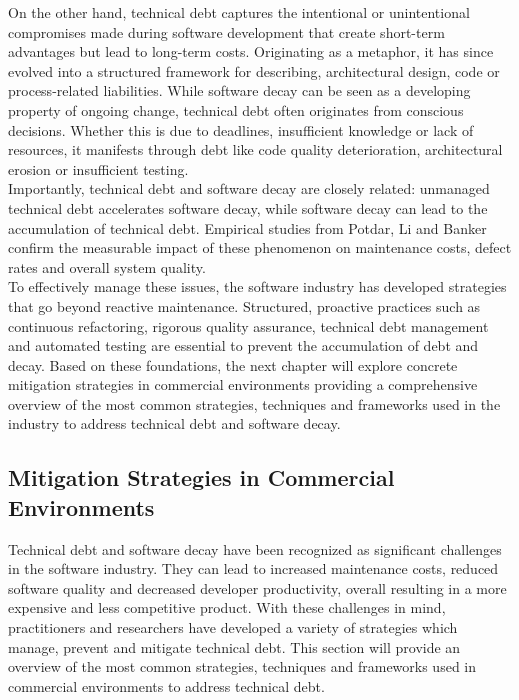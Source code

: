 On the other hand, technical debt captures the intentional or unintentional compromises made during software development that create short-term advantages but lead to long-term costs. Originating as a metaphor, it has since evolved into a structured framework for describing, architectural design, code or process-related liabilities.
While software decay can be seen as a developing property of ongoing change, technical debt often originates from conscious decisions. Whether this is due to deadlines, insufficient knowledge or lack of resources, it manifests through debt like code quality deterioration, architectural erosion or insufficient testing.\\

Importantly, technical debt and software decay are closely related: unmanaged technical debt accelerates software decay, while software decay can lead to the accumulation of technical debt. Empirical studies from Potdar, Li and Banker confirm the measurable impact of these phenomenon on maintenance costs, defect rates and overall system quality.\\

To effectively manage these issues, the software industry has developed strategies that go beyond reactive maintenance. Structured, proactive practices such as continuous refactoring, rigorous quality assurance, technical debt management and automated testing are essential to prevent the accumulation of debt and decay.
Based on these foundations, the next chapter will explore concrete mitigation strategies in commercial environments providing a comprehensive overview of the most common strategies, techniques and frameworks used in the industry to address technical debt and software decay.\\



\subsection{Mitigation Strategies in Commercial Environments}
Technical debt and software decay have been recognized as significant challenges in the software industry. They can lead to 
increased maintenance costs, reduced software quality and decreased developer productivity, overall resulting in a more expensive and less competitive product.
With these challenges in mind, practitioners and researchers have developed a variety of strategies which manage, prevent and mitigate technical debt.
This section will provide an overview of the most common strategies, techniques and frameworks used in commercial environments to address technical debt.\\

